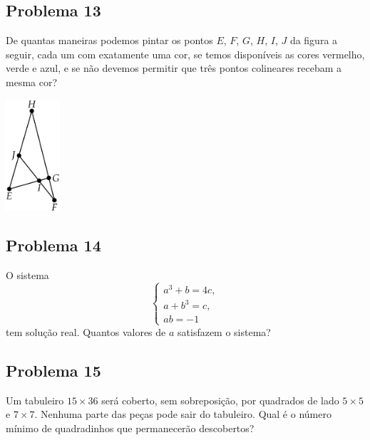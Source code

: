 \documentclass[12pt]{article}
\begin{document}
\clearpage

\subsection{Problema 13}
\begin{tcolorbox}[statementbox]
  De quantas maneiras podemos pintar os pontos $E$, $F$, $G$, $H$, $I$, $J$ da figura a seguir, cada um com exatamente
uma cor, se temos disponíveis as cores vermelho, verde e azul, e se não devemos permitir que três pontos
colineares recebam a mesma cor?
\begin{center}
  \includegraphics[width=0.15\textwidth]{fifth.png}
\end{center}
\end{tcolorbox}

\clearpage

\subsection{Problema 14}
\begin{tcolorbox}[statementbox]
O sistema
\[
  \begin{cases}
    a^3 + b = 4c,\\
    a + b^3 = c,\\
    ab = -1
  \end{cases}
\]
tem solução real. Quantos valores de \(a\) satisfazem o sistema?
\end{tcolorbox}

\clearpage

\subsection{Problema 15}
\begin{tcolorbox}[statementbox]
Um tabuleiro \(15 \times 36\) será coberto, sem sobreposição, por quadrados de lado \(5 \times 5\) e \(7 \times 7\). Nenhuma
parte das peças pode sair do tabuleiro. Qual é o número mínimo de quadradinhos que permanecerão descobertos?
\end{tcolorbox}
\end{document}
